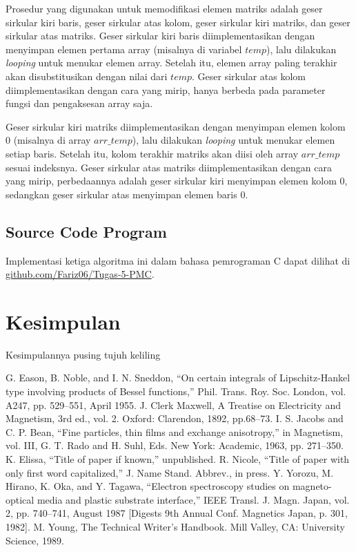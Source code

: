 \documentclass[conference]{IEEEtran}
\begin{document}
Prosedur yang digunakan untuk memodifikasi elemen matriks adalah geser sirkular kiri baris, geser sirkular atas kolom, geser sirkular kiri matriks, dan geser sirkular atas matriks.
Geser sirkular kiri baris diimplementasikan dengan menyimpan elemen pertama array (misalnya di variabel $temp$), lalu dilakukan \textit{looping} untuk menukar elemen array.
Setelah itu, elemen array paling terakhir akan disubstitusikan dengan nilai dari $temp$.
Geser sirkular atas kolom diimplementasikan dengan cara yang mirip, hanya berbeda pada parameter fungsi dan pengaksesan array saja.

Geser sirkular kiri matriks diimplementasikan dengan menyimpan elemen kolom 0 (misalnya di array $arr\_temp$), lalu dilakukan \textit{looping} untuk menukar elemen setiap baris.
Setelah itu, kolom terakhir matriks akan diisi oleh array $arr\_temp$ sesuai indeksnya.
Geser sirkular atas matriks diimplementasikan dengan cara yang mirip, 
perbedaannya adalah geser sirkular kiri menyimpan elemen kolom 0, sedangkan geser sirkular atas menyimpan elemen baris 0.

\subsection{Source Code Program}
Implementasi ketiga algoritma ini dalam bahasa pemrograman C dapat dilihat di
\href{https://github.com/Fariz06/Tugas-5-PMC}{github.com/Fariz06/Tugas-5-PMC}.

\section{Kesimpulan}
Kesimpulannya pusing tujuh keliling

\begin{thebibliography}{00}
 G. Eason, B. Noble, and I. N. Sneddon, ``On certain integrals of Lipschitz-Hankel type involving products of Bessel functions,'' Phil. Trans. Roy. Soc. London, vol. A247, pp. 529--551, April 1955.
 J. Clerk Maxwell, A Treatise on Electricity and Magnetism, 3rd ed., vol. 2. Oxford: Clarendon, 1892, pp.68--73.
 I. S. Jacobs and C. P. Bean, ``Fine particles, thin films and exchange anisotropy,'' in Magnetism, vol. III, G. T. Rado and H. Suhl, Eds. New York: Academic, 1963, pp. 271--350.
 K. Elissa, ``Title of paper if known,'' unpublished.
 R. Nicole, ``Title of paper with only first word capitalized,'' J. Name Stand. Abbrev., in press.
 Y. Yorozu, M. Hirano, K. Oka, and Y. Tagawa, ``Electron spectroscopy studies on magneto-optical media and plastic substrate interface,'' IEEE Transl. J. Magn. Japan, vol. 2, pp. 740--741, August 1987 [Digests 9th Annual Conf. Magnetics Japan, p. 301, 1982].
 M. Young, The Technical Writer's Handbook. Mill Valley, CA: University Science, 1989.
\end{thebibliography}
\end{document}
